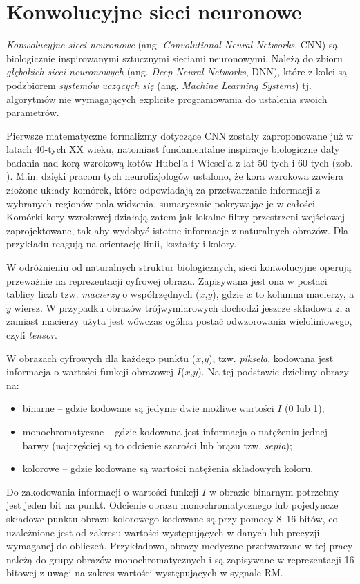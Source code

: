 \chapter{Konwolucyjne sieci neuronowe}
\label{CNNs}
\textit{Konwolucyjne sieci neuronowe} (ang. \textit{Convolutional Neural Networks}, CNN) są biologicznie inspirowanymi sztucznymi sieciami neuronowymi. Należą do zbioru \textit{głębokich sieci neuronowych} (ang. \textit{Deep Neural Networks}, DNN), które z kolei są podzbiorem \textit{systemów uczących się} (ang. \textit{Machine Learning Systems}) tj. algorytmów nie wymagających explicite programowania do ustalenia swoich parametrów.

Pierwsze matematyczne formalizmy dotyczące CNN zostały zaproponowane już w latach 40-tych XX wieku, natomiast fundamentalne inspiracje biologiczne dały badania nad korą wzrokową kotów Hubel'a i Wiesel’a z lat 50-tych i 60-tych (zob. \cite{Wurtz2009}). M.in. dzięki pracom tych neurofizjologów ustalono, że kora wzrokowa zawiera złożone układy komórek, które odpowiadają za przetwarzanie informacji z wybranych regionów pola widzenia, sumarycznie pokrywając je w całości. Komórki kory wzrokowej działają zatem jak lokalne filtry przestrzeni wejściowej zaprojektowane, tak aby wydobyć istotne informacje z naturalnych obrazów. Dla przykładu reagują na orientację linii, kształty i kolory.

W odróżnieniu od naturalnych struktur biologicznych, sieci konwolucyjne operują przeważnie na reprezentacji cyfrowej obrazu. Zapisywana jest ona w postaci tablicy liczb tzw. \textit{macierzy} o współrzędnych ($x$,$y$), gdzie $x$ to kolumna macierzy, a $y$ wiersz. W przypadku obrazów trójwymiarowych dochodzi jeszcze składowa $z$, a zamiast macierzy użyta jest wówczas ogólna postać odwzorowania wieloliniowego, czyli \textit{tensor}.

W obrazach cyfrowych dla każdego punktu ($x$,$y$), tzw. \textit{piksela}, kodowana jest informacja o wartości funkcji obrazowej $I$($x$,$y$). Na tej podstawie dzielimy obrazy na:
\begin{itemize}
	\item binarne – gdzie kodowane są jedynie dwie możliwe wartości $I$ (0 lub 1);
	\item monochromatyczne – gdzie kodowana jest informacja o natężeniu jednej barwy (najczęściej są to odcienie szarości lub brązu tzw. \textit{sepia});
	\item kolorowe – gdzie kodowane są wartości natężenia składowych koloru.
\end{itemize}
Do zakodowania informacji o wartości funkcji $I$ w obrazie binarnym potrzebny jest jeden bit na punkt. Odcienie obrazu monochromatycznego lub pojedyncze składowe punktu obrazu kolorowego kodowane są przy pomocy 8--16 bitów, co uzależnione jest od zakresu wartości występujących w danych lub precyzji wymaganej do obliczeń. Przykładowo, obrazy medyczne przetwarzane w tej pracy należą do grupy obrazów monochromatycznych i są zapisywane w reprezentacji 16 bitowej z uwagi na zakres wartości występujących w sygnale RM.

